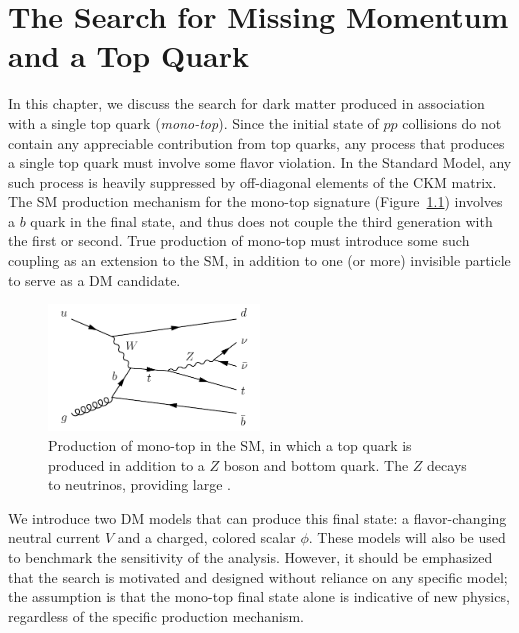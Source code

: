 \boldmath
\chapter{The Search for Missing Momentum and a Top Quark}
\unboldmath
\label{sec:mt}

In this chapter, we discuss the search for dark matter produced in association with a single top quark (\emph{mono-top}).
Since the initial state of $pp$ collisions do not contain any appreciable contribution from top quarks, any process that produces a single top quark must involve some flavor violation.
In the Standard Model, any such process is heavily suppressed by off-diagonal elements of the CKM matrix.
The SM production mechanism for the mono-top signature (Figure~\ref{fig:mt:tzq}) involves a $b$ quark in the final state, and thus does not couple the third generation with the first or second.
True production of mono-top must introduce some such coupling as an extension to the SM, in addition to one (or more) invisible particle to serve as a DM candidate.

\begin{figure}[]
    \begin{center}
        \includegraphics[width=0.5\textwidth]{figures/monotop/diagrams/tzq.pdf}
        \caption{Production of mono-top in the SM, in which a top quark is produced in addition to a $Z$ boson and bottom quark. The $Z$ decays to neutrinos, providing large \ptmiss.}
        \label{fig:mt:tzq}
    \end{center}
\end{figure}

We introduce two DM models that can produce this final state: a flavor-changing neutral current $V$ and a charged, colored scalar $\phi$.
These models will also be used to benchmark the sensitivity of the analysis.
However, it should be emphasized that the search is motivated and designed without reliance on any specific model; the assumption is that the mono-top final state alone is indicative of new physics, regardless of the specific production mechanism.

